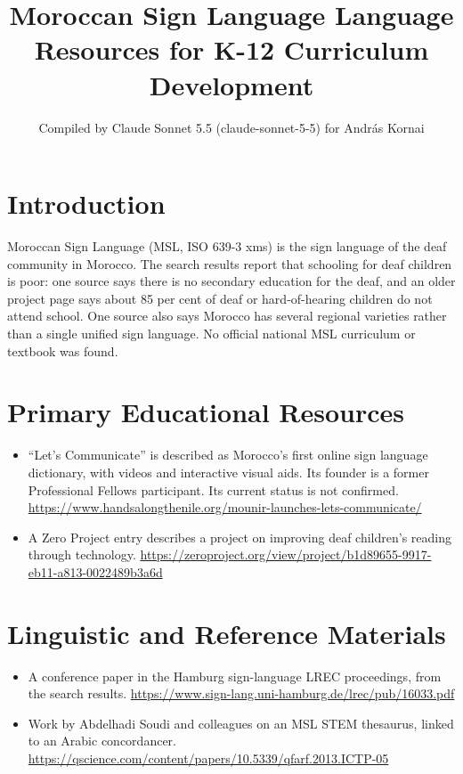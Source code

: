 \documentclass[12pt]{article}
\title{Moroccan Sign Language Language Resources for K-12 Curriculum Development}
\author{Compiled by Claude Sonnet 5.5 (claude-sonnet-5-5) for Andr\'as Kornai}
\date{}
\begin{document}
\maketitle

\section{Introduction}
Moroccan Sign Language (MSL, ISO 639-3 xms) is the sign language of the deaf community in Morocco. The search results report that schooling for deaf children is poor: one source says there is no secondary education for the deaf, and an older project page says about 85 per cent of deaf or hard-of-hearing children do not attend school. One source also says Morocco has several regional varieties rather than a single unified sign language. No official national MSL curriculum or textbook was found.

\section{Primary Educational Resources}
\begin{itemize}
\item ``Let's Communicate'' is described as Morocco's first online sign language dictionary, with videos and interactive visual aids. Its founder is a former Professional Fellows participant. Its current status is not confirmed. \url{https://www.handsalongthenile.org/mounir-launches-lets-communicate/}
\item A Zero Project entry describes a project on improving deaf children's reading through technology. \url{https://zeroproject.org/view/project/b1d89655-9917-eb11-a813-0022489b3a6d}
\end{itemize}

\section{Linguistic and Reference Materials}
\begin{itemize}
\item A conference paper in the Hamburg sign-language LREC proceedings, from the search results. \url{https://www.sign-lang.uni-hamburg.de/lrec/pub/16033.pdf}
\item Work by Abdelhadi Soudi and colleagues on an MSL STEM thesaurus, linked to an Arabic concordancer. \url{https://qscience.com/content/papers/10.5339/qfarf.2013.ICTP-05}
\end{itemize}
\end{document}
